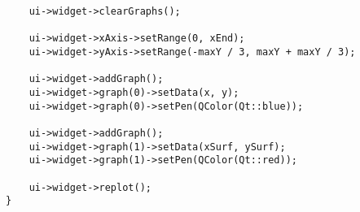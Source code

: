 \begin{enumerate}
\begin{lstlisting}
    ui->widget->clearGraphs();

    ui->widget->xAxis->setRange(0, xEnd);
    ui->widget->yAxis->setRange(-maxY / 3, maxY + maxY / 3);

    ui->widget->addGraph();
    ui->widget->graph(0)->setData(x, y);
    ui->widget->graph(0)->setPen(QColor(Qt::blue));

    ui->widget->addGraph();
    ui->widget->graph(1)->setData(xSurf, ySurf);
    ui->widget->graph(1)->setPen(QColor(Qt::red));

    ui->widget->replot();
}
\end{lstlisting}

\end{enumerate}